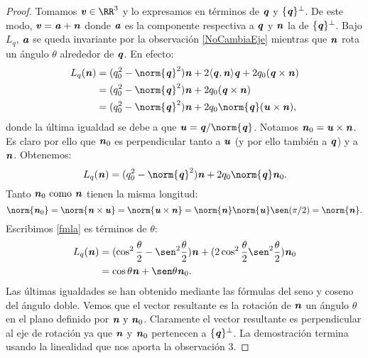 \begin{proof}
Tomamos $ \vv \in \RR^3 $ y lo expresamos en términos de $ \textbf{\emph{q}} $ y $ \lbrace\textbf{\emph{q}} \rbrace^\perp $. De este modo, $ \textbf{\emph{v}} = \textbf{\emph{a}} + \textbf{\emph{n}} $ donde $ \textbf{\emph{a}} $ es la componente respectiva a $ \textbf{\emph{q}} $ y $ \textbf{\emph{n}} $ la de $ \lbrace\textbf{\emph{q}} \rbrace^\perp $. Bajo $ L_q $, $ \textbf{\emph{a}} $ se queda invariante por la observación \ref{NoCambiaEje} mientras que $ \textbf{\emph{n}} $ rota un ángulo $ \theta $ alrededor de $ \textbf{\emph{q}} $. En efecto:
\begin{equation*}
	\begin{split}
	L_q(\nn) &= (q_0^2-\norm{\qq}^2)\nn + 2\langle\qq , \nn\rangle\qq + 2q_0(\qq \times \nn)\\
		&= (q_0^2-\norm{\qq}^2)\nn + 2q_0(\qq \times \nn) \\
		&= (q_0^2-\norm{\qq}^2)\nn + 2q_0\norm{\qq}(\uu \times \nn),
			\end{split}
			\end{equation*} 	
			donde la última igualdad se debe a que $ \uu = \qq / \norm{\qq} $. Notamos $ \textbf{\emph{n}}_0= \textbf{\emph{u}} \times \textbf{\emph{n}}$. Es claro por ello que $ \textbf{\emph{n}}_0 $ es perpendicular tanto a $ \textbf{\emph{u}} $ (y por ello también a $ \textbf{\emph{q}} $) y a $ \textbf{\emph{n}} $. Obtenemos: 
			\begin{equation}\label{fmla}
				L_q(\nn) =  (q_0^2-\norm{\qq}^2)\nn + 2q_0\norm{\qq}\nn_0.
			\end{equation} 
			Tanto $ \textbf{\emph{n}}_0 \text{ como }  \textbf{\emph{n}} $ tienen la misma longitud:
			\begin{equation*}
				\norm{\nn_0} = \norm{\nn \times \uu} = \norm{\uu \times \nn} = \norm{\nn}\norm{\uu}\sen(\pi/2) = \norm{\nn}.
			\end{equation*}
			Escribimos \ref{fmla} es términos de $ \theta $:
			\begin{equation*}
			\begin{split}
			L_q(\nn) &= (\cos^2\frac{\theta}{2} - \sen^2\frac{\theta}{2})\nn + (2\cos^2\frac{\theta}{2}\sen^2\frac{\theta}{2})\nn_0 \\
			&= \cos\theta\nn + \sen\theta\nn_0.
			\end{split}
			\end{equation*}
			Las últimas igualdades se han obtenido mediante las fórmulas del seno y coseno del ángulo doble. Vemos que el vector resultante es la rotación de $ \textbf{\emph{n}} $ un ángulo $ \theta $ en el plano definido por $ \textbf{\emph{n}} \text{ y } \textbf{\emph{n}}_0 $. Claramente el vector resultante es perpendicular al eje de rotación ya que $ \textbf{\emph{n}}$ y $ \textbf{\emph{n}}_0 $ pertenecen a $ \lbrace \textbf{\emph{q}} \rbrace ^\perp$. La demostración termina usando la linealidad que nos aporta la observación 3.
		\end{proof}
	 	\bigskip
	 	
